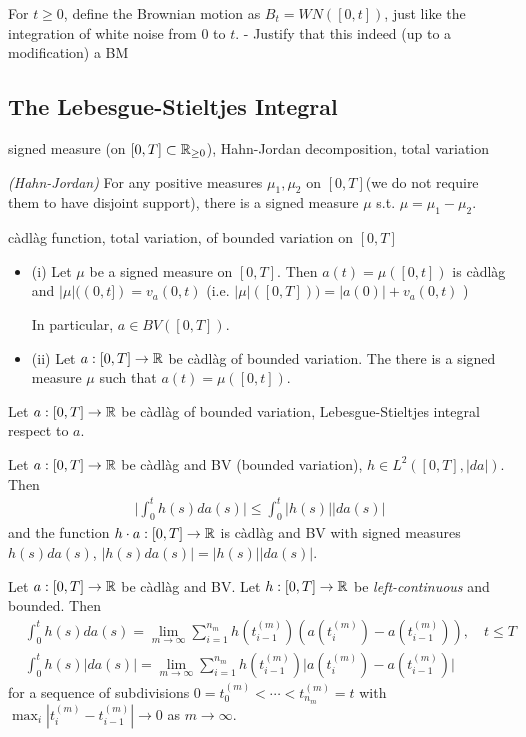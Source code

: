 \documentclass[10pt,a4paper]{article}
\renewenvironment{i}
{\begin{itemize} 
	}%
	{\end{itemize}
}
\begin{document}
For $t\geq 0$, define the Brownian motion as $B_t = WN([0,t])$, just like the integration of white noise from 0 to $t$. - Justify that this indeed (up to a modification) a BM

\subsection{The Lebesgue-Stieltjes Integral}

 signed measure (on $[0, T]\subset \mathbb{R}_{\geq 0}$), Hahn-Jordan decomposition, total variation
\s

\prop \emph{(Hahn-Jordan)} For any positive measures $\mu_1, \mu_2$ on $[0, T]$(we do not require them to have disjoint support), there is a signed measure $\mu$ s.t. $\mu = \mu_1 - \mu_2$.
\s

 c\`{a}dl\`{a}g function, total variation, of bounded variation on $[0, T]$
\s

\prop \begin{i}
\item[(i)] Let $\mu$ be a signed measure on $[0, T]$. Then $a(t) = \mu ([0,t])$ is c\`adl\`ag and $|\mu|((0,t]) = v_a(0,t)$ (i.e. $|\mu|([0,T])) = |a(0)| + v_a(0,t)$ )

\quad In particular, $a\in BV([0,T])$.
\item[(ii)] Let $a: [0, T] \rightarrow \mathbb{R}$ be c\`adl\`ag of bounded variation. The there is a signed measure $\mu$ such that $a(t) = \mu([0,t])$.
\end{i}
\s

 Let $a:[0,T]\rightarrow \mathbb{R}$ be c\`adl\`ag of bounded variation, Lebesgue-Stieltjes integral respect to $a$.
\s

\fact Let $a: [0,T] \rightarrow \mathbb{R}$ be c\`adl\`ag and BV (bounded variation), $h\in L^2([0,T], |da|)$. Then
\begin{align*}
\Big| \int_0^t h(s) da(s )\Big| \leq \int_0^t |h(s)| |da(s)|
\end{align*}
and the function $h\cdot a:[0,T]\rightarrow \mathbb{R}$ is c\`adl\`ag and BV with signed measures $h(s)da(s)$, $|h(s)da(s)| = |h(s)||da(s)|$.
\s

\prop Let $a: [0,T] \rightarrow \mathbb{R}$ be c\`adl\`ag and BV. Let $h:[0,T] \rightarrow \mathbb{R}$ be \emph{left-continuous} and bounded. Then
\begin{align*}
& \int_0^t h(s) da(s) = \lim_{m\rightarrow \infty} \sum_{i=1}^{n_m} h(t_{i-1}^{(m)})(a(t_i^{(m)}) - a(t_{i-1}^{(m)})), \quad t\leq T \\
& \int_0^t h(s) |da(s)| = \lim_{m\rightarrow \infty} \sum_{i=1}^{n_m} h(t_{i-1}^{(m)})\Big|a(t_i^{(m)}) - a(t_{i-1}^{(m)})\Big|
\end{align*}
for a sequence of subdivisions $0=t_0^{(m)} < \cdots < t_{n_m}^{(m)}=t$ with $\max_i |t_i^{(m)} - t_{i-1}^{(m)}| \rightarrow 0$ as $m\rightarrow \infty$.
\s
\end{document}
